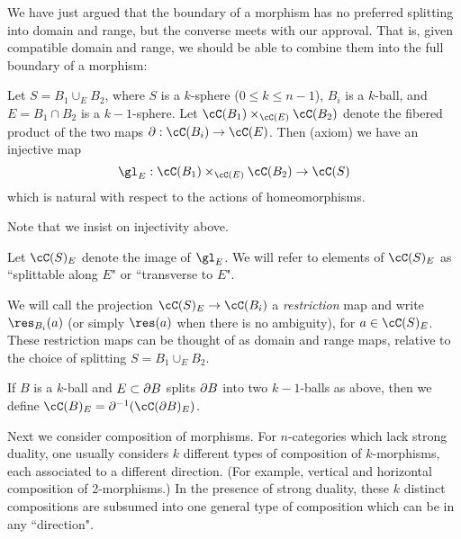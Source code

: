 \medskip
{}
\medskip

We have just argued that the boundary of a morphism has no preferred splitting into
domain and range, but the converse meets with our approval.
That is, given compatible domain and range, we should be able to combine them into
the full boundary of a morphism:

{Let $S = B_1 \cup_E B_2$, where $S$ is a $k$-sphere ($0\le k\le n-1$),
$B_i$ is a $k$-ball, and $E = B_1\cap B_2$ is a $k{-}1$-sphere.
Let $\cC(B_1) \times_{\cC(E)} \cC(B_2)$ denote the fibered product of the 
two maps $\bd: \cC(B_i)\to \cC(E)$.
Then (axiom) we have an injective map
\[
	\gl_E : \cC(B_1) \times_{\cC(E)} \cC(B_2) \to \cC(S)
\]
which is natural with respect to the actions of homeomorphisms.}

Note that we insist on injectivity above.

Let $\cC(S)_E$ denote the image of $\gl_E$.
We will refer to elements of $\cC(S)_E$ as ``splittable along $E$" or ``transverse to $E$". 

We will call the projection $\cC(S)_E \to \cC(B_i)$
a {\it restriction} map and write $\res_{B_i}(a)$
(or simply $\res(a)$ when there is no ambiguity), for $a\in \cC(S)_E$.
These restriction maps can be thought of as
domain and range maps, relative to the choice of splitting $S = B_1 \cup_E B_2$.

If $B$ is a $k$-ball and $E \subset \partial B$ splits $\partial B$ into two $k{-}1$-balls
as above, then we define $\cC(B)_E = \bd^{-1}(\cC(\bd B)_E)$.

Next we consider composition of morphisms.
For $n$-categories which lack strong duality, one usually considers
$k$ different types of composition of $k$-morphisms, each associated to a different direction.
(For example, vertical and horizontal composition of 2-morphisms.)
In the presence of strong duality, these $k$ distinct compositions are subsumed into 
one general type of composition which can be in any ``direction".

